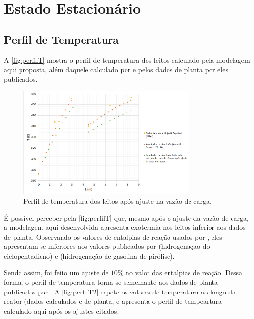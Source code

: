 \section{Estado Estacionário} \label{sec:estadoestacionario}

\subsection{Perfil de Temperatura} \label{sec:perfildetemperatura}

A \autoref{fig:perfilT} mostra o perfil de temperatura dos leitos
calculado pela modelagem aqui proposta, além daquele calculado por
 e pelos dados de planta por eles publicados.  

\begin{figure}[htb]
\centering \includegraphics[width=0.8\textwidth]{images/Chap4/perfilT.png}
\caption{Perfil de temperatura dos leitos após ajuste na vazão de carga.}
\label{fig:perfilT}
\end{figure}

É possível perceber pela \autoref{fig:perfilT} que, mesmo após o ajuste da vazão
de carga, a modelagem aqui desenvolvida apresenta exotermia nos leitos inferior
aos dados de planta. Observando os valores de entalpias de reação usados por
, eles apresentam-se inferiores aos valores publicados
por  (hidrogenação do ciclopentadieno) e
 (hidrogenação de gasolina de pirólise).

Sendo assim, foi feito um ajuste de $10 \%$ no valor das entalpias de reação.
Dessa forma, o perfil de temperatura torna-se semelhante aos dados de planta
publicados por . A \autoref{fig:perfilT2} repete os
valores de temperatura ao longo do reator (dados calculados e de planta, e
apresenta o perfil de tempeartura calculado aqui após os ajustes citados.

